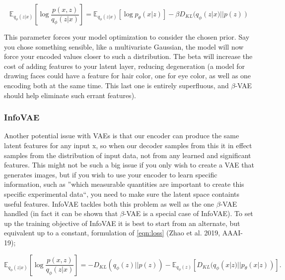 \begin{equation}\label{eqn:beta}
 \mathbb{E}_{q_\phi(z|x)}\left[\log \frac{p(x,z)}{q_\phi(z|x)}  \right]
 = \mathbb{E}_{q_\phi(z|x)}[\log p_\theta (x|z)] -\beta D_{KL}(q_\phi(z|x)||p(z))
\end{equation}

This parameter forces your model optimization to consider the chosen prior. Say you chose something sensible, like a multivariate Gaussian, the model will now force your encoded values closer to such a distribution. The beta will increase the cost of adding features to your latent layer, reducing degeneration (a model for drawing faces could have a feature for hair color, one for eye color, as well as one encoding both at the same time. This last one is entirely superfluous, and $\beta$-VAE should help eliminate such errant features).

\subsubsection{InfoVAE}


Another potential issue with VAEs is that our encoder can produce the same latent features for any input x, so when our decoder samples from this it in effect samples from the distribution of input data, not from any learned and significant features.
This might not be such a big issue if you only wish to create a VAE that generates images, but if you wish to use your encoder to learn specific information, such as ''which measurable quantities are important to create this specific experimental data``, you need to make sure the latent space containts useful features.
InfoVAE tackles both this problem as well as the one $\beta$-VAE handled (in fact it can be shown that $\beta$-VAE is a special case of InfoVAE).
To set up the training objective of InfoVAE it is best to start from an alternate, but equivalent up to a constant, formulation of \autoref{eqn:loss} (Zhao et al. 2019, AAAI-19);

\begin{equation} \label{eqn:4}
 \mathbb{E}_{q_\phi(z|x)}\left[\log \frac{p(x,z)}{q_\phi(z|x)}  \right]
 =-D_{KL}(q_\phi(z)||p(z))-\mathbb{E}_{q_\phi(z)}[D_{KL}(q_\phi(x|z)||p_\theta(x|z))].
\end{equation}

